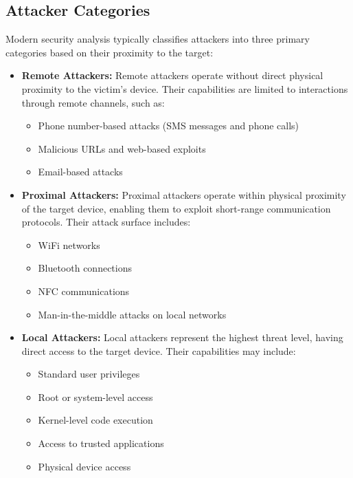 \documentclass{article}
\begin{document}
\subsection{Attacker Categories}
Modern security analysis typically classifies attackers into three primary categories based on their proximity to the target:

\begin{itemize}
    \item \textbf{Remote Attackers:} 
           Remote attackers operate without direct physical proximity to the victim's device. 
           Their capabilities are limited to interactions through remote channels, such as:
              \begin{itemize}
                \item Phone number-based attacks (SMS messages and phone calls)
                \item Malicious URLs and web-based exploits
                \item Email-based attacks
            \end{itemize}
    \item \textbf{Proximal Attackers:}
            Proximal attackers operate within physical proximity of the target device, enabling them to exploit short-range communication protocols.
            Their attack surface includes:
            \begin{itemize}
                \item WiFi networks
                \item Bluetooth connections
                \item NFC communications
                \item Man-in-the-middle attacks on local networks
            \end{itemize}
    \item \textbf{Local Attackers:}
            Local attackers represent the highest threat level, having direct access to the target device. Their capabilities may include:
            \begin{itemize}
                \item Standard user privileges
                \item Root or system-level access
                \item Kernel-level code execution
                \item Access to trusted applications
                \item Physical device access
            \end{itemize}
    
\end{itemize}
\end{document}
